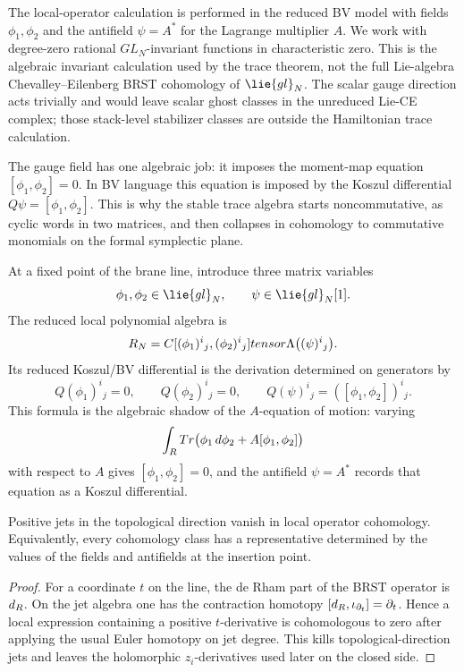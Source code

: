 \documentclass[11pt]{memoir}
\begin{document}
The local-operator calculation is performed in the reduced BV model with
fields $\phi_1,\phi_2$ and the antifield $\psi=A^*$ for the Lagrange
multiplier $A$. We work with degree-zero rational \(GL_N\)-invariant
functions in characteristic zero.  This is the algebraic invariant
calculation used by the trace theorem, not the full Lie-algebra
Chevalley--Eilenberg BRST cohomology of \(\lie{gl}_N\).  The scalar
gauge direction acts trivially and would leave scalar ghost classes in
the unreduced Lie-CE complex; those stack-level stabilizer classes are
outside the Hamiltonian trace calculation.

The gauge field has one algebraic job: it imposes the moment-map equation
$[\phi_1,\phi_2]=0$. In BV language this equation is imposed by the Koszul
differential $Q\psi=[\phi_1,\phi_2]$. This is why the stable trace algebra
starts noncommutative, as cyclic words in two matrices, and then collapses in
cohomology to commutative monomials on the formal symplectic plane.

\begin{constr}\label{constr:reduced-bv-algebra}
  At a fixed point of the brane line, introduce three matrix variables
  $$\phi_1,\phi_2\in\lie{gl}_N,\qquad \psi\in\lie{gl}_N[1].$$
  The reduced local polynomial algebra is
  $$R_N=C[(\phi_1)^i{}_j,(\phi_2)^i{}_j]
    tensor\Lambda\bigl((\psi)^i{}_j\bigr).$$
  Its reduced Koszul/BV differential is the derivation determined on generators by
  $$Q(\phi_1)^i{}_j=0,\qquad Q(\phi_2)^i{}_j=0,\qquad
    Q(\psi)^i{}_j=([\phi_1,\phi_2])^i{}_j.$$
  This formula is the algebraic shadow of the $A$-equation of motion:
  varying
  $$\int_{R}Tr\bigl(\phi_1\,d\phi_2+A[\phi_1,\phi_2]\bigr)$$
  with respect to $A$ gives $[\phi_1,\phi_2]=0$, and the antifield $\psi=A^*$
  records that equation as a Koszul differential.
\end{constr}

\begin{lem}\label{lem:derivative-jets}
  Positive jets in the topological direction vanish in local
  operator cohomology. Equivalently, every cohomology class has a representative
  determined by the values of the fields and antifields at the insertion point.
\end{lem}

\begin{proof}
  For a coordinate $t$ on the line, the de Rham part of the BRST operator is
  $d_{R}$. On the jet algebra one has the contraction homotopy
  $[d_{R},\iota_{\partial_t}]=\partial_t$. Hence a local expression containing
  a positive $t$-derivative is cohomologous to zero after applying the usual
  Euler homotopy on jet degree. This kills topological-direction jets and leaves
  the holomorphic $z_i$-derivatives used later on the closed side.
\end{proof}
\end{document}
